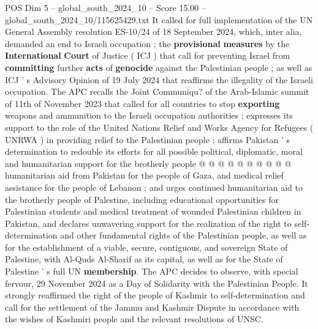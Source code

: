 \begin{textsample}{POS Dim 5 – global\_south\_2024\_10 – Score 15.00 – global\_south\_2024\_10/115625429.txt}
It called for full implementation of the UN General Assembly resolution ES-10/24 of 18 September 2024, which, inter alia, demanded an end to Israeli occupation ; the \textbf{provisional} \textbf{measures} by the \textbf{International} \textbf{Court} of Justice ( ICJ ) that call for preventing Israel from \textbf{committing} further \textbf{acts} of \textbf{genocide} against the Palestinian people ; as well as ICJ ' s Advisory Opinion of 19 July 2024 that reaffirms the illegality of the Israeli occupation.
The APC recalls the Joint Communiqu? of the Arab-Islamic summit of 11th of November 2023 that called for all countries to stop \textbf{exporting} weapons and ammunition to the Israeli occupation authorities ; expresses its support to the role of the United Nations Relief and Works Agency for Refugees ( UNRWA ) in providing relief to the Palestinian people ; affirms Pakistan ' s determination to redouble its efforts for all possible political, diplomatic, moral and humanitarian support for the brotherly people @ @ @ @ @ @ @ @ @ @ humanitarian aid from Pakistan for the people of Gaza, and medical relief assistance for the people of Lebanon ; and urges continued humanitarian aid to the brotherly people of Palestine, including educational opportunities for Palestinian students and medical treatment of wounded Palestinian children in Pakistan, and declares unwavering support for the realization of the right to self-determination and other fundamental rights of the Palestinian people, as well as for the establishment of a viable, secure, contiguous, and sovereign State of Palestine, with Al-Quds Al-Sharif as its capital, as well as for the State of Palestine ' s full UN \textbf{membership}.
The APC decides to observe, with special fervour, 29 November 2024 as a Day of Solidarity with the Palestinian People.
It strongly reaffirmed the right of the people of Kashmir to self-determination and call for the settlement of the Jammu and Kashmir Dispute in accordance with the wishes of Kashmiri people and the relevant resolutions of UNSC.

\end{textsample}
